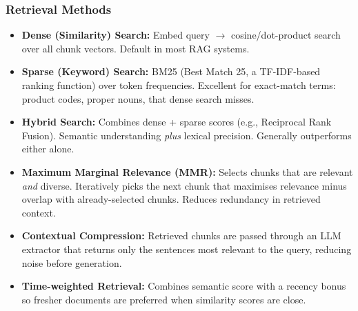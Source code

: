 \begin{frame}[fragile]\frametitle{Retrieval Methods}

\begin{itemize}
  \item \textbf{Dense (Similarity) Search:} Embed query $\rightarrow$ cosine/dot-product search over all chunk vectors. Default in most RAG systems.

  \item \textbf{Sparse (Keyword) Search:} BM25 (Best Match 25, a TF-IDF-based ranking function) over token frequencies. Excellent for exact-match terms: product codes, proper nouns, that dense search misses.

  \item \textbf{Hybrid Search:} Combines dense + sparse scores (e.g., Reciprocal Rank Fusion). Semantic understanding \textit{plus} lexical precision. Generally outperforms either alone.

  \item \textbf{Maximum Marginal Relevance (MMR):} Selects chunks that are relevant \textit{and} diverse. Iteratively picks the next chunk that maximises relevance minus overlap with already-selected chunks. Reduces redundancy in retrieved context.


  \item \textbf{Contextual Compression:} Retrieved chunks are passed through an LLM extractor that returns only the sentences most relevant to the query, reducing noise before generation.

  \item \textbf{Time-weighted Retrieval:} Combines semantic score with a recency bonus so fresher documents are preferred when similarity scores are close.
\end{itemize}

\end{frame}

